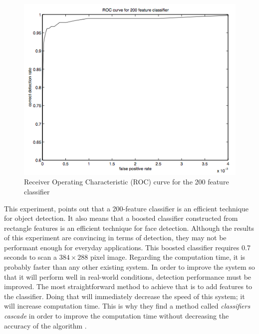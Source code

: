 \begin{figure}[!h]
\begin{center}
\noindent \includegraphics[scale=0.8]{figures/haar_feature_example_result} 
\newline
\caption{Receiver Operating Characteristic (ROC) curve for the 200 feature classifier \cite{VIO01}}
\label{haar_feature_example_result}
\end{center} 
\end{figure}

\noindent This experiment, points out that a 200-feature classifier is an efficient technique for object detection. It also means that a boosted classifier constructed from rectangle features is an efficient technique for face detection. Although the results of this experiment are convincing in terms of detection, they may not be performant enough for everyday applications. This boosted classifier requires 0.7 seconds to scan a $ 384\times288 $ pixel image. Regarding the computation time, it is probably faster than any other existing system. In order to improve the system so that it will perform well in real-world conditions, detection performance must be improved. The most straightforward method to achieve that is to add features to the classifier. Doing that will immediately decrease the speed of this system; it will increase computation time. This is why they find a method called \textit{classifiers cascade} in order to improve the computation time without decreasing the accuracy of the algorithm \cite{VIO01}.
\newline


